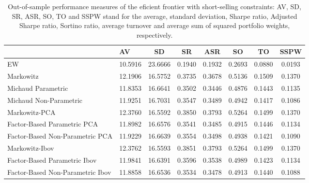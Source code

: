 \begin{table}

\caption{\label{tab:empirical_ef_2}Out-of-sample performance measures of the eficient frontier with short-selling constraints: AV, SD, SR, ASR, SO, TO and SSPW stand for the average, standard deviation, Sharpe ratio, Adjusted Sharpe ratio, Sortino ratio, average turnover and average sum of squared portfolio weights, respectively.}
\centering
\begin{tabular}[t]{l|l|c|c|c|c|c|c}
\hline
  & AV & SD & SR & ASR & SO & TO & SSPW\\
\hline
EW & 10.5916 & 23.6666 & 0.1940 & 0.1932 & 0.2693 & 0.0880 & 0.0193\\
\hline
Markowitz & 12.1906 & 16.5752 & 0.3735 & 0.3678 & 0.5136 & 0.1509 & 0.1370\\
\hline
Michaud Parametric & 11.8353 & 16.6641 & 0.3502 & 0.3446 & 0.4876 & 0.1443 & 0.1135\\
\hline
Michaud Non-Parametric & 11.9251 & 16.7031 & 0.3547 & 0.3489 & 0.4942 & 0.1417 & 0.1086\\
\hline
Markowitz-PCA & 12.3760 & 16.5592 & 0.3850 & 0.3793 & 0.5264 & 0.1499 & 0.1370\\
\hline
Factor-Based Parametric PCA & 11.8982 & 16.6576 & 0.3541 & 0.3485 & 0.4915 & 0.1446 & 0.1134\\
\hline
Factor-Based Non-Parametric PCA & 11.9229 & 16.6639 & 0.3554 & 0.3498 & 0.4938 & 0.1421 & 0.1090\\
\hline
Markowitz-Ibov & 12.3762 & 16.5593 & 0.3851 & 0.3793 & 0.5264 & 0.1499 & 0.1370\\
\hline
Factor-Based Parametric Ibov & 11.9841 & 16.6391 & 0.3596 & 0.3538 & 0.4989 & 0.1423 & 0.1134\\
\hline
Factor-Based Non-Parametric Ibov & 11.8858 & 16.6536 & 0.3534 & 0.3478 & 0.4913 & 0.1440 & 0.1088\\
\hline
\end{tabular}
\end{table}
